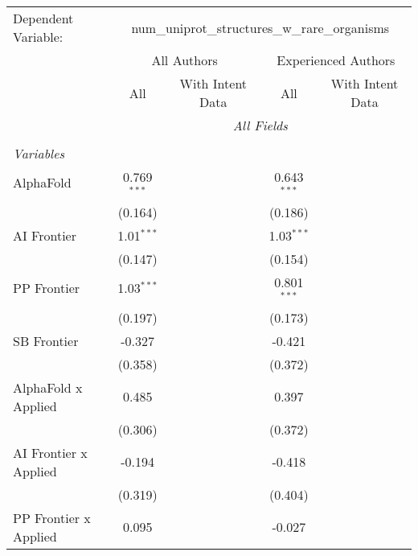 \begingroup
\centering
\begin{tabular}{lcccccc}
   \tabularnewline \midrule \midrule
   Dependent Variable: & \multicolumn{6}{c}{num\_uniprot\_structures\_w\_rare\_organisms}\\
 & \multicolumn{3}{c}{All Authors} & \multicolumn{3}{c}{Experienced Authors} \\
\cmidrule(lr){2-4} \cmidrule(lr){5-7}
 & \multicolumn{1}{c}{All} & \multicolumn{2}{c}{With Intent Data} & \multicolumn{1}{c}{All} & \multicolumn{2}{c}{With Intent Data} \\
\cmidrule(lr){2-2} \cmidrule(lr){3-4} \cmidrule(lr){5-5} \cmidrule(lr){6-7}
 & \multicolumn{6}{c}{\textit{All Fields}} \\ \\
   \emph{Variables}\\
   AlphaFold             & 0.769$^{***}$ &         &         & 0.643$^{***}$ &         &   \\   
                         & (0.164)       &         &         & (0.186)       &         &   \\   
   AI Frontier           & 1.01$^{***}$  &         &         & 1.03$^{***}$  &         &   \\   
                         & (0.147)       &         &         & (0.154)       &         &   \\   
   PP Frontier           & 1.03$^{***}$  &         &         & 0.801$^{***}$ &         &   \\   
                         & (0.197)       &         &         & (0.173)       &         &   \\   
   SB Frontier           & -0.327        &         &         & -0.421        &         &   \\   
                         & (0.358)       &         &         & (0.372)       &         &   \\   
   AlphaFold x Applied   & 0.485         &         &         & 0.397         &         &   \\   
                         & (0.306)       &         &         & (0.372)       &         &   \\   
   AI Frontier x Applied & -0.194        &         &         & -0.418        &         &   \\   
                         & (0.319)       &         &         & (0.404)       &         &   \\   
   PP Frontier x Applied & 0.095         &         &         & -0.027        &         &   \\   

\end{tabular}
